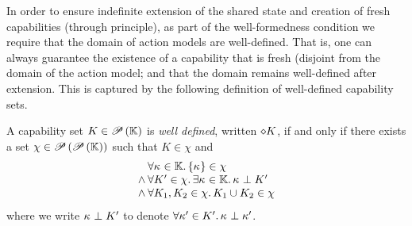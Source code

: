 In order to ensure indefinite extension of the shared state and  creation of fresh capabilities (through \extendRule principle), as part of the well-formedness condition we require that the domain of action models are well-defined. That is, one can always guarantee the existence of a capability that is fresh (disjoint from the domain of the action model; and that the domain remains well-defined after extension. This is captured by the following definition of well-defined capability sets. 
%
%
\begin{definition}
A capability set $K \in \mathscr{P}\left(\mathbb{K} \right)$ is \emph{well defined}, written $\diamond K$, if and only if there exists a set $\chi \in \mathscr{P}\left(\mathscr{P}\left(\mathbb{K} \right) \right)$ such that $K \in \chi$ and 
%
\[
\begin{array}{l @{\hspace{2pt}} l}
	& \for{\ca{} \in \Caps} \{\ca{}\} \in \chi \\
	\land &\for{K' \in \chi}\exsts{\ca{} \in \Caps} \ca{} \disjoint K'  \\
	\land &\for{K_1, K_2 \in \chi} K_1 \cup K_2 \in \chi
\end{array}		
\]
%
%
where we write $\kappa_{} \mathrel{\bot} K'$ to denote $\forall \kappa_{}' \in K'.\, \kappa_{} \mathrel{\bot} \kappa_{}'$. 
%
\end{definition}

